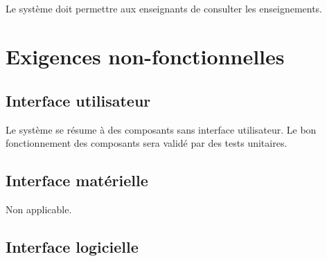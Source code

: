 \subsection{}
\begin{requirement}
	Le système doit permettre aux enseignants de consulter les enseignements.
\end{requirement}

\section{Exigences non-fonctionnelles}\label{section:non-fonctionnelles}
	\subsection{Interface utilisateur}
Le système se résume à des composants sans interface utilisateur. 
Le bon fonctionnement des composants sera validé par des tests unitaires.

	\subsection{Interface matérielle}
Non applicable.

	\subsection{Interface logicielle}

